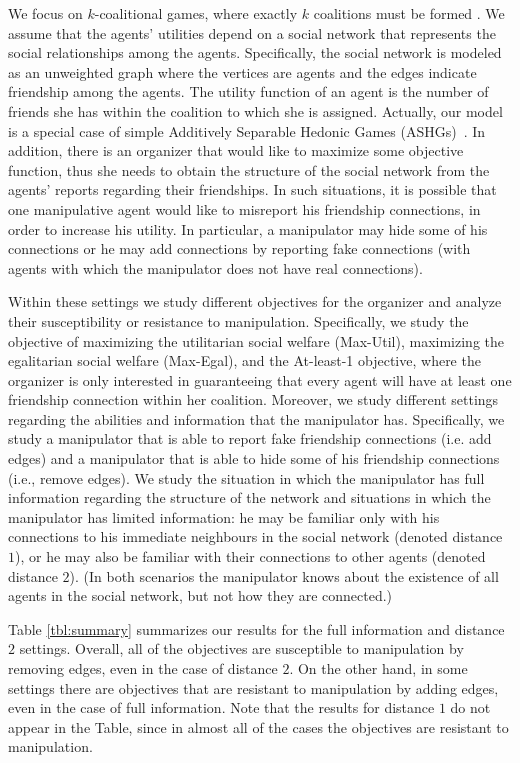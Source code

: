 \documentclass{article}
\begin{document}
  

We focus on $k$-coalitional games, where exactly $k$ coalitions must be formed \cite{sless2018forming}. We assume that the agents' utilities depend on a social network that represents the social relationships among the agents. Specifically, the social network is modeled as an unweighted graph where the vertices are agents and the edges indicate friendship among the agents. The utility function of an agent is the number of friends she has within the coalition to which she is assigned. Actually, our model is a special case of simple Additively Separable Hedonic Games (ASHGs)~\cite{bogomolnaia2002stability}.
In addition, there is an organizer that would like to maximize some objective function, thus she needs to obtain the structure of the social network from the agents' reports regarding their friendships. 
In such situations, it is possible that one manipulative agent would like to misreport his friendship connections, in order to increase his utility. In particular, a manipulator may hide some of his connections or he may add connections by reporting fake connections (with agents with which the manipulator does not have real connections).

Within these settings we study different objectives for the organizer and analyze their susceptibility or resistance to manipulation. Specifically, we study the objective of maximizing the utilitarian social welfare (Max-Util), maximizing the egalitarian social welfare (Max-Egal), and the At-least-1 objective, where the organizer is only interested in guaranteeing that every agent will have at least one friendship connection within her coalition.
Moreover, we study different settings regarding the abilities and information that the manipulator has. Specifically, we study a manipulator that is able to report fake friendship connections (i.e. add edges) and a manipulator that is able to hide some of his friendship connections (i.e., remove edges). We study the situation in which the manipulator has full information regarding the structure of the network and situations in which the manipulator has limited information: he may be familiar only with his connections to his immediate neighbours in the social network (denoted distance $1$), or he may also be familiar with their connections to other agents (denoted distance $2$). (In both scenarios the manipulator knows about the existence of all agents in the social network, but not how they are connected.)

Table \ref{tbl:summary} summarizes our results for the full information and distance $2$ settings.
Overall, all of the objectives are susceptible to manipulation by removing edges, even in the case of distance $2$. On the other hand, in some settings there are objectives that are resistant to manipulation by adding edges, even in the case of full information.
Note that the results for distance $1$ do not appear in the Table, since in almost all of the cases the objectives are resistant to manipulation.
\end{document}
